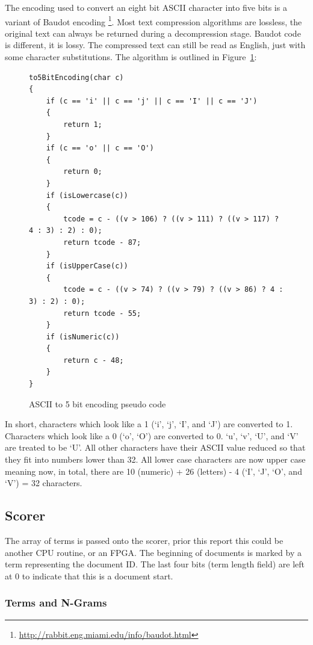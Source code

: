 The encoding used to convert an eight bit ASCII character into five bits is a
variant of Baudot encoding
\footnote{\url{http://rabbit.eng.miami.edu/info/baudot.html}}. Most text
compression algorithms are lossless, the original text can always be returned
during a decompression stage. Baudot code is different, it is lossy. The
compressed text can still be read as English, just with some character
substitutions. The algorithm is outlined in Figure~\ref{baudotCode}:

\begin{figure}[H]
\small\begin{verbatim}
to5BitEncoding(char c)
{
    if (c == 'i' || c == 'j' || c == 'I' || c == 'J')
    {
        return 1;
    }
    if (c == 'o' || c == 'O')
    {
        return 0;
    }
    if (isLowercase(c))
    {
        tcode = c - ((v > 106) ? ((v > 111) ? ((v > 117) ? 4 : 3) : 2) : 0);
        return tcode - 87;
    }
    if (isUpperCase(c))
    {
        tcode = c - ((v > 74) ? ((v > 79) ? ((v > 86) ? 4 : 3) : 2) : 0);
        return tcode - 55;
    }
    if (isNumeric(c))
    {
        return c - 48;
    }
}
\end{verbatim}
\caption{ASCII to 5 bit encoding pseudo code}
\label{baudotCode}
\end{figure}

In short, characters which look like a 1 (`i', `j', `I', and `J') are converted
to 1. Characters which look like a 0 (`o', `O') are converted to 0. `u', `v',
`U', and `V' are treated to be `U'. All other characters have their ASCII value
reduced so that they fit into numbers lower than 32. All lower case characters
are now upper case meaning now, in total, there are 10 (numeric) + 26 (letters)
- 4 (`I', `J', `O', and `V') = 32 characters.

\subsection{Scorer}

The array of terms is passed onto the scorer, prior this report this could be
another CPU routine, or an FPGA. The beginning of documents is marked by a term
representing the document ID. The last four bits (term length field) are left
at 0 to indicate that this is a document start.

\subsubsection{Terms and N-Grams}

